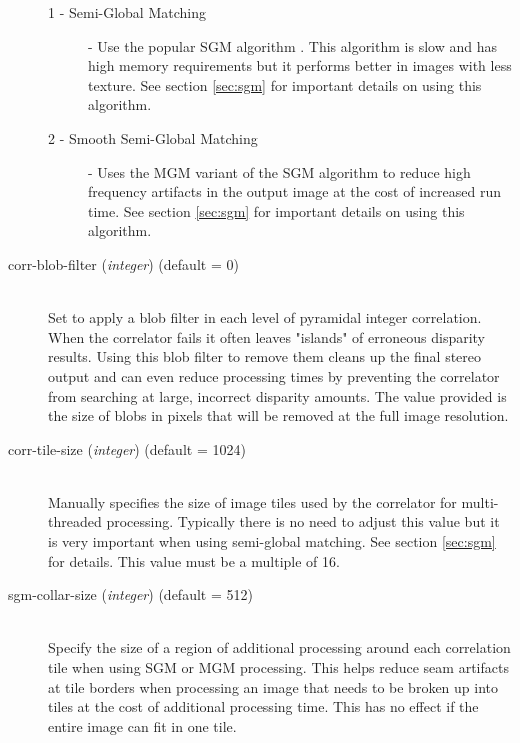 \begin{description}
\begin{description}
    \item[1 - Semi-Global Matching] - Use the popular SGM algorithm \citep{hirschmuller_sgm_original}.
    This algorithm is slow and has high memory requirements but it performs better in images with
    less texture.  See section \ref{sec:sgm} for important details on using this algorithm.

    \item[2 - Smooth Semi-Global Matching] - Uses the MGM variant of the SGM algorithm 
    \citep{facciolo2015mgm} to reduce high frequency artifacts in the output image at the cost 
    of increased run time. See section \ref{sec:sgm} for important details on using this algorithm.
  \end{description}

\item[corr-blob-filter \textnormal{\small{(\emph{integer})}} (default = 0)]\hfill \\

  Set to apply a blob filter in each level of pyramidal integer correlation.
  When the correlator fails it often leaves "islands" of erroneous disparity results.
  Using this blob filter to remove them cleans up the final stereo output and
  can even reduce processing times by preventing the correlator from searching
  at large, incorrect disparity amounts.  The value provided is the size of blobs
  in pixels that will be removed at the full image resolution.

\item[corr-tile-size \textnormal{\small{(\emph{integer})}} (default = 1024)]\hfill \\

  Manually specifies the size of image tiles used by the correlator for multi-threaded
  processing. Typically there is no need to adjust this value but it is very important
  when using semi-global matching. See section \ref{sec:sgm} for details.  This value
  must be a multiple of 16.

\item[sgm-collar-size \textnormal{\small{(\emph{integer})}} (default = 512)]\hfill \\

  Specify the size of a region of additional processing around each correlation tile when
  using SGM or MGM processing.  This helps reduce seam artifacts at tile borders when
  processing an image that needs to be broken up into tiles at the cost of additional
  processing time.  This has no effect if the entire image can fit in one tile.

\end{description}

